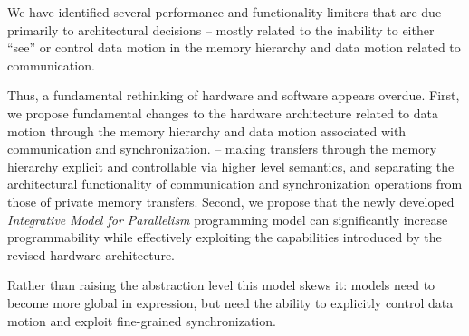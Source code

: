 We have identified several performance and 
functionality limiters that are due primarily to architectural decisions -- 
mostly related to the inability to either ``see'' or control data motion in the memory hierarchy
and data motion related to communication.

Thus, a fundamental rethinking of hardware and software appears overdue.   First, we propose
fundamental changes to the hardware architecture related to data motion through the memory
hierarchy and data motion associated with communication and synchronization. 
-- making transfers
through the memory hierarchy explicit and controllable via higher
level semantics, and separating
the architectural functionality of communication and synchronization operations from those of
private memory transfers.
Second, we propose that the newly developed \textit{Integrative Model for Parallelism} programming 
model can significantly increase programmability while effectively exploiting the capabilities introduced 
by the revised hardware architecture.

Rather than raising the abstraction level this model skews it:
models need to become more global in expression, but need the ability to explicitly control data motion 
and exploit fine-grained synchronization.

\endinput
The hardware part of this project will lead to greater power efficiency, lower latency,
and  better suitability for massive multi-threading; the software part will 
deliver a productive programming model that can effectively utilize this hardware.

\bparagraph{Intellectual merit}
%
This project is distinctive in that it links the architectural requirements of programming models and hardware.
Solely redesigning hardware to drive down its cost or increase its efficiency is not enough
if the algorithm semantics do not reach it.  New programming models will not be effective
if the hardware does not provide the required control and/or efficiency.
Thus, our approach seems an important step on the way to developing a software/hardware
architecture more suited to cost- and power-effective large-scale parallelism.

\bparagraph{Broader impact}
%
Our co-designed software/hardware stack will have clear benefits
by facilitating research on the exascale. It will also offer easier
programmability on hardware that is simpler to produce (this has
obvious effects on the computer industry) and more efficient 
to deploy. Thus the realization of our ideas will benefit
large parts of science.

